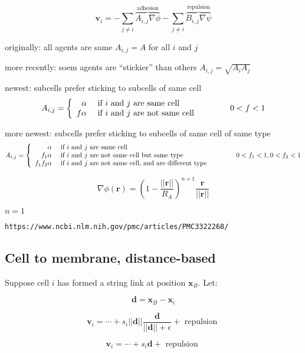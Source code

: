 \documentclass[11point]{article}
\renewcommand{\vec}[1]{\mathbf{#1}}
\newcommand{\norm}[1]{ \left|\left|\mathbf{#1} \right|\right|}
\begin{document}
$$\vec{v}_i  = 
-\sum_{j \ne i } \overbrace{ A_{i,j} \nabla \phi }^\textrm{adhesion}
-\sum_{j \ne i } \overbrace{ B_{i,j} \nabla \psi  }^{\textrm{repulsion}}
$$

originally: all agents are same
$A_{i,j} = A$ for all $i$ and $j$

more recently: soem agents are ``stickier'' than others 
$A_{i,j}  = \sqrt{ A_i A_j }$ 

newest: subcells prefer sticking to subcells of same cell 
$$A_{i,j} = \left\{
\begin{array}{rl}
\alpha & \textrm{ if } i \textrm{ and } j \textrm{ are same cell} \\
f\alpha & \textrm{ if } i \textrm{ and } j \textrm{ are not same cell} \\
\end{array}
\right. 
\hspace{0.5in} 
0 < f < 1 
$$

more newest: subcells prefer sticking to subcells of same cell of same type
$$A_{i,j} = \left\{
\begin{array}{rl}
\alpha & \textrm{ if } i \textrm{ and } j \textrm{ are same cell} \\
f_1 \alpha & \textrm{ if } i \textrm{ and } j \textrm{ are not same cell but same type} \\
f_1 f_2 \alpha & \textrm{ if } i \textrm{ and } j \textrm{ are not same cell, and are different type} 
\end{array}
\right. 
\hspace{0.5in} 
0 < f_1 < 1 , 0 < f_2 < 1 
$$

$$
\nabla \phi (\vec{r} )  = \left( 1 - \frac{ \norm{r} }{ R_A} \right)^{n+1} \frac{ \vec{r}}{ \norm{r}} 
$$

$n =1$ 

\verb|https://www.ncbi.nlm.nih.gov/pmc/articles/PMC3322268/|

\subsection{Cell to membrane, distance-based}
Suppose cell $i$ has  formed a string link at position $\vec{x}_B$. Let: 

$$
\vec{d} = \vec{x}_B  - \vec{x}_i 
$$

$$
\vec{v}_i = \cdots + s_i  \norm{d}  \frac{ \vec{d}}{\norm{d}+\epsilon} + \textrm{ repulsion }
$$

$$
\vec{v}_i = \cdots + s_i  \vec{d} + \textrm{ repulsion }
$$
\end{document}
